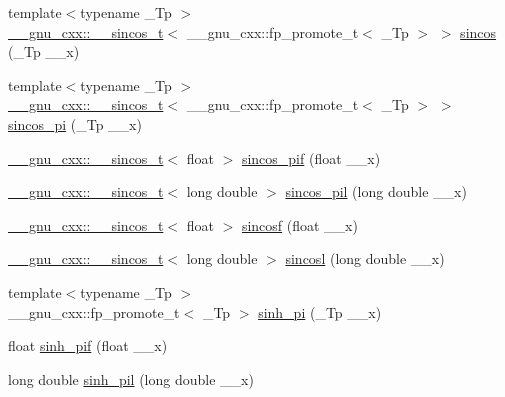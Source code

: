\begin{DoxyCompactItemize}
\item 
{\footnotesize template$<$typename \+\_\+\+Tp $>$ }\\\hyperlink{struct____gnu__cxx_1_1____sincos__t}{\+\_\+\+\_\+gnu\+\_\+cxx\+::\+\_\+\+\_\+sincos\+\_\+t}$<$ \+\_\+\+\_\+gnu\+\_\+cxx\+::fp\+\_\+promote\+\_\+t$<$ \+\_\+\+Tp $>$ $>$ \hyperlink{group__gnu__math__spec__func_ga5d3a375ada451e0a9a78441ddfcf52a3}{sincos} (\+\_\+\+Tp \+\_\+\+\_\+x)
\item 
{\footnotesize template$<$typename \+\_\+\+Tp $>$ }\\\hyperlink{struct____gnu__cxx_1_1____sincos__t}{\+\_\+\+\_\+gnu\+\_\+cxx\+::\+\_\+\+\_\+sincos\+\_\+t}$<$ \+\_\+\+\_\+gnu\+\_\+cxx\+::fp\+\_\+promote\+\_\+t$<$ \+\_\+\+Tp $>$ $>$ \hyperlink{group__gnu__math__spec__func_ga6553883f127ea0de67041c3128e03813}{sincos\+\_\+pi} (\+\_\+\+Tp \+\_\+\+\_\+x)
\item 
\hyperlink{struct____gnu__cxx_1_1____sincos__t}{\+\_\+\+\_\+gnu\+\_\+cxx\+::\+\_\+\+\_\+sincos\+\_\+t}$<$ float $>$ \hyperlink{group__gnu__math__spec__func_gacf416c867a8a456f8f0e3d8b45ca8bd5}{sincos\+\_\+pif} (float \+\_\+\+\_\+x)
\item 
\hyperlink{struct____gnu__cxx_1_1____sincos__t}{\+\_\+\+\_\+gnu\+\_\+cxx\+::\+\_\+\+\_\+sincos\+\_\+t}$<$ long double $>$ \hyperlink{group__gnu__math__spec__func_ga1f1efc07313a3de1e994d89c3b83b957}{sincos\+\_\+pil} (long double \+\_\+\+\_\+x)
\item 
\hyperlink{struct____gnu__cxx_1_1____sincos__t}{\+\_\+\+\_\+gnu\+\_\+cxx\+::\+\_\+\+\_\+sincos\+\_\+t}$<$ float $>$ \hyperlink{group__gnu__math__spec__func_ga3929d13e38535418cd24db5cee80660c}{sincosf} (float \+\_\+\+\_\+x)
\item 
\hyperlink{struct____gnu__cxx_1_1____sincos__t}{\+\_\+\+\_\+gnu\+\_\+cxx\+::\+\_\+\+\_\+sincos\+\_\+t}$<$ long double $>$ \hyperlink{group__gnu__math__spec__func_ga96a7222e47d430a228973658ca9f6f35}{sincosl} (long double \+\_\+\+\_\+x)
\item 
{\footnotesize template$<$typename \+\_\+\+Tp $>$ }\\\+\_\+\+\_\+gnu\+\_\+cxx\+::fp\+\_\+promote\+\_\+t$<$ \+\_\+\+Tp $>$ \hyperlink{group__gnu__math__spec__func_gade43453b87b6b38c05b3fcce40870542}{sinh\+\_\+pi} (\+\_\+\+Tp \+\_\+\+\_\+x)
\item 
float \hyperlink{group__gnu__math__spec__func_ga74103f57ab0d97126732f3cb276c5ab3}{sinh\+\_\+pif} (float \+\_\+\+\_\+x)
\item 
long double \hyperlink{group__gnu__math__spec__func_ga2232ee554ef2a902824db42e2e09c483}{sinh\+\_\+pil} (long double \+\_\+\+\_\+x)

\end{DoxyCompactItemize}
